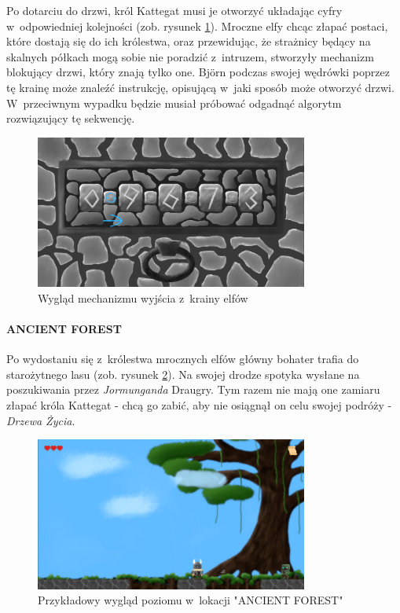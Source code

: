 \documentclass[12pt,a4paper,oneside]{book}
\theoremstyle{definition}
\numberwithin{equation}{chapter}
\begin{document}
\par Po dotarciu do drzwi, król Kattegat musi je otworzyć układając cyfry w~odpowiedniej kolejności (zob. rysunek \ref{BubbleSort}). Mroczne elfy chcąc złapać postaci, które dostają się do ich królestwa, oraz przewidując, że strażnicy będący na skalnych półkach mogą sobie nie poradzić z~intruzem, stworzyły mechanizm blokujący drzwi, który znają tylko one. Björn podczas swojej wędrówki poprzez tę krainę może znaleźć instrukcję, opisującą w~jaki sposób może otworzyć drzwi. W~przeciwnym wypadku będzie musiał próbować odgadnąć algorytm rozwiązujący tę sekwencję.

\begin{figure}[hpt!]
        \centering
        \includegraphics[width=0.8\textwidth]{poziomy/bubble.png}
        \caption{Wygląd mechanizmu wyjścia z~krainy elfów}
        \label{BubbleSort}
    \end{figure}
\newpage

\paragraph{ANCIENT FOREST}\hfill \break

\par Po wydostaniu się z~królestwa mrocznych elfów główny bohater trafia do starożytnego lasu (zob. rysunek \ref{ForestPlatform}). Na swojej drodze spotyka wysłane na poszukiwania przez \textit{Jormunganda} Draugry. Tym razem nie mają one zamiaru złapać króla Kattegat - chcą go zabić, aby nie osiągnął on celu swojej podróży - \textit{Drzewa Życia}.

\begin{figure}[hpt!]
        \centering
        \includegraphics[width=0.8\textwidth]{poziomy/ancientforest.png}
        \caption{Przykładowy wygląd poziomu w~lokacji "ANCIENT FOREST"}
        \label{ForestPlatform}
    \end{figure}
\end{document}
